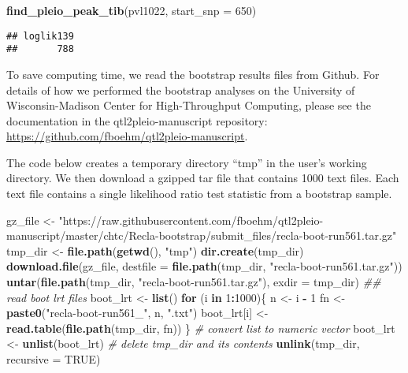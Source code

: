 \documentclass{book}
\newenvironment{Shaded}{\begin{snugshade}}{\end{snugshade}}
\newcommand{\CommentTok}[1]{\textcolor[rgb]{0.56,0.35,0.01}{\textit{#1}}}
\newcommand{\ControlFlowTok}[1]{\textcolor[rgb]{0.13,0.29,0.53}{\textbf{#1}}}
\newcommand{\DataTypeTok}[1]{\textcolor[rgb]{0.13,0.29,0.53}{#1}}
\newcommand{\DecValTok}[1]{\textcolor[rgb]{0.00,0.00,0.81}{#1}}
\newcommand{\KeywordTok}[1]{\textcolor[rgb]{0.13,0.29,0.53}{\textbf{#1}}}
\newcommand{\NormalTok}[1]{#1}
\newcommand{\OperatorTok}[1]{\textcolor[rgb]{0.81,0.36,0.00}{\textbf{#1}}}
\newcommand{\OtherTok}[1]{\textcolor[rgb]{0.56,0.35,0.01}{#1}}
\newcommand{\StringTok}[1]{\textcolor[rgb]{0.31,0.60,0.02}{#1}}
\begin{document}
\begin{Shaded}
\begin{Highlighting}[]
\KeywordTok{find_pleio_peak_tib}\NormalTok{(pvl1022, }\DataTypeTok{start_snp =} \DecValTok{650}\NormalTok{)}
\end{Highlighting}
\end{Shaded}

\begin{verbatim}
## loglik139 
##       788
\end{verbatim}

To save computing time, we read the bootstrap results files from Github.
For details of how we performed the bootstrap analyses on the University
of Wisconsin-Madison Center for High-Throughput Computing, please see
the documentation in the qtl2pleio-manuscript repository:
\url{https://github.com/fboehm/qtl2pleio-manuscript}.

The code below creates a temporary directory ``tmp'' in the user's
working directory. We then download a gzipped tar file that contains
1000 text files. Each text file contains a single likelihood ratio test
statistic from a bootstrap sample.

\begin{Shaded}
\begin{Highlighting}[]
\NormalTok{gz_file <-}\StringTok{ "https://raw.githubusercontent.com/fboehm/qtl2pleio-manuscript/master/chtc/Recla-bootstrap/submit_files/recla-boot-run561.tar.gz"}
\NormalTok{tmp_dir <-}\StringTok{ }\KeywordTok{file.path}\NormalTok{(}\KeywordTok{getwd}\NormalTok{(), }\StringTok{"tmp"}\NormalTok{)}
\KeywordTok{dir.create}\NormalTok{(tmp_dir)}
\KeywordTok{download.file}\NormalTok{(gz_file, }\DataTypeTok{destfile =} \KeywordTok{file.path}\NormalTok{(tmp_dir, }\StringTok{"recla-boot-run561.tar.gz"}\NormalTok{))}
\KeywordTok{untar}\NormalTok{(}\KeywordTok{file.path}\NormalTok{(tmp_dir, }\StringTok{"recla-boot-run561.tar.gz"}\NormalTok{), }\DataTypeTok{exdir =}\NormalTok{ tmp_dir)}
\CommentTok{## read boot lrt files}
\NormalTok{boot_lrt <-}\StringTok{ }\KeywordTok{list}\NormalTok{()}
\ControlFlowTok{for}\NormalTok{ (i }\ControlFlowTok{in} \DecValTok{1}\OperatorTok{:}\DecValTok{1000}\NormalTok{)\{}
\NormalTok{  n <-}\StringTok{ }\NormalTok{i }\OperatorTok{-}\StringTok{ }\DecValTok{1}
\NormalTok{  fn <-}\StringTok{ }\KeywordTok{paste0}\NormalTok{(}\StringTok{"recla-boot-run561_"}\NormalTok{, n, }\StringTok{".txt"}\NormalTok{)}
\NormalTok{  boot_lrt[i] <-}\StringTok{ }\KeywordTok{read.table}\NormalTok{(}\KeywordTok{file.path}\NormalTok{(tmp_dir, fn))}
\NormalTok{\}}
\CommentTok{# convert list to numeric vector}
\NormalTok{boot_lrt <-}\StringTok{ }\KeywordTok{unlist}\NormalTok{(boot_lrt)}
\CommentTok{# delete tmp_dir and its contents}
\KeywordTok{unlink}\NormalTok{(tmp_dir, }\DataTypeTok{recursive =} \OtherTok{TRUE}\NormalTok{)}
\end{Highlighting}
\end{Shaded}
\end{document}
